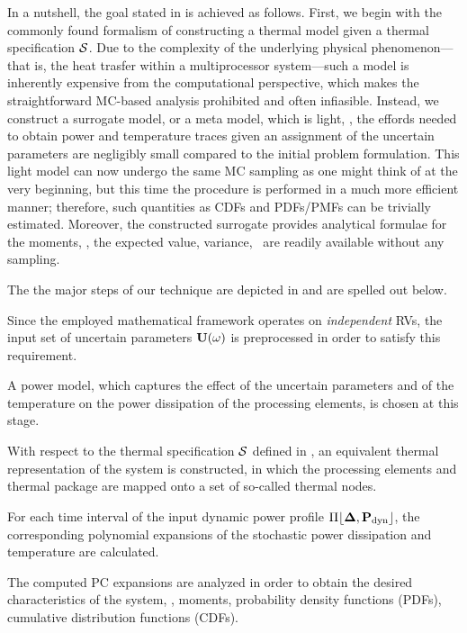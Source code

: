 In a nutshell, the goal stated in  is achieved as follows. First, we begin with the commonly found formalism of constructing a thermal model given a thermal specification $\mathcal{S}$. Due to the complexity of the underlying physical phenomenon---that is, the heat trasfer within a multiprocessor system---such a model is inherently expensive from the computational perspective, which makes the straightforward MC-based analysis prohibited and often infiasible. Instead, we construct a surrogate model, or a meta model, which is light, \ie, the effords needed to obtain power and temperature traces given an assignment of the uncertain parameters are negligibly small compared to the initial problem formulation. This light model can now undergo the same MC sampling as one might think of at the very beginning, but this time the procedure is performed in a much more efficient manner; therefore, such quantities as CDFs and PDFs/PMFs can be trivially estimated. Moreover, the constructed surrogate provides analytical formulae for the moments, \ie, the expected value, variance, \etc\ are readily available without any sampling.

The the major steps of our technique are depicted in  and are spelled out below.

 Since the employed mathematical framework operates on \emph{independent} RVs, the input set of uncertain parameters $\mathbf{U}(\omega)$ is preprocessed in order to satisfy this requirement.

 A power model, which captures the effect of the uncertain parameters and of the temperature on the power dissipation of the processing elements, is chosen at this stage.

 With respect to the thermal specification $\mathcal{S}$ defined in , an equivalent thermal representation of the system is constructed, in which the processing elements and thermal package are mapped onto a set of so-called thermal nodes.

 For each time interval of the input dynamic power profile $\profPdyn$, the corresponding polynomial expansions of the stochastic power dissipation and temperature are calculated.

 The computed PC expansions are analyzed in order to obtain the desired characteristics of the system, \eg, moments, probability density functions (PDFs), cumulative distribution functions (CDFs).

